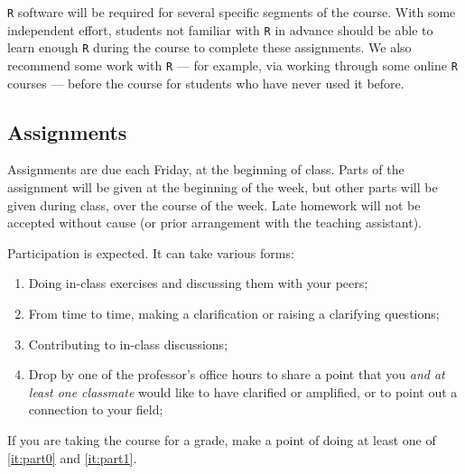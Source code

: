 \documentclass[12pt]{article}
\begin{document}
\begin{verse}   \end{verse}

\begin{verse}  \end{verse}

\texttt{R} software will be required for several specific segments of the course. With some independent effort, students not familiar with \texttt{R} in advance should be able to learn enough \texttt{R} during the course to complete these assignments. We also recommend some work with \texttt{R} --- for example, via working through some online \texttt{R} courses --- before the course for students who have never used it before.


\subsection*{Assignments}
Assignments are due each Friday, at the beginning of
class. Parts of the assignment will be given at the beginning of the week, but other parts will be given during class, over the course of the week.  Late homework will not be accepted without cause (or prior arrangement with the teaching assistant).

Participation is expected. It can take various forms:
\begin{enumerate}
\item Doing in-class exercises and discussing them with your peers;
\item From time to time, making a clarification or raising a clarifying questions;
\item \label{it:part0} Contributing to in-class discussions;
\item \label{it:part1} Drop by one of the professor's office hours to share a point that you \textit{and at least one classmate} would like to have clarified or amplified, or to point out a connection to your field;
\end{enumerate}
If you are taking the course for a grade, make a point of doing at
least one of \ref{it:part0} and \ref{it:part1}. %
\end{document}
